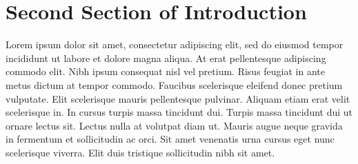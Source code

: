 \section{Second Section of Introduction}

Lorem ipsum dolor sit amet, consectetur adipiscing elit, sed do eiusmod tempor incididunt ut labore et dolore magna aliqua. At erat pellentesque adipiscing commodo elit. Nibh ipsum consequat nisl vel pretium. Risus feugiat in ante metus dictum at tempor commodo. Faucibus scelerisque eleifend donec pretium vulputate. Elit scelerisque mauris pellentesque pulvinar. Aliquam etiam erat velit scelerisque in. In cursus turpis massa tincidunt dui. Turpis massa tincidunt dui ut ornare lectus sit. Lectus nulla at volutpat diam ut. Mauris augue neque gravida in fermentum et sollicitudin ac orci. Sit amet venenatis urna cursus eget nunc scelerisque viverra. Elit duis tristique sollicitudin nibh sit amet.